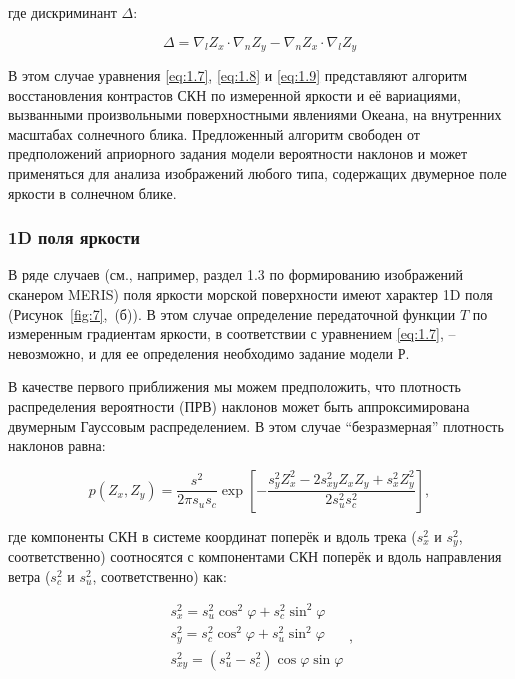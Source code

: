 \noindent где дискриминант $\Delta $:


\begin{equation} \label{eq:1.10)} 
\Delta =\nabla _{l} Z_{x} \cdot \nabla _{n} Z_{y}^{} -\nabla _{n} Z_{x} \cdot \nabla _{l} Z_{y}^{}  
\end{equation} 


В этом случае уравнения \eqref{eq:1.7}, \eqref{eq:1.8} и \eqref{eq:1.9} представляют алгоритм восстановления контрастов СКН по измеренной яркости и её вариациями, вызванными произвольными поверхностными явлениями Океана, на внутренних масштабах солнечного блика. Предложенный алгоритм свободен от предположений априорного задания модели вероятности наклонов и может применяться для анализа изображений любого типа, содержащих двумерное поле яркости в солнечном блике.



\subsubsection{1D поля яркости}

В ряде случаев (см., например, раздел 1.3 по формированию изображений сканером MERIS) поля яркости морской поверхности имеют характер 1D поля (Рисунок~\ref{fig:7},~(б)). В этом случае определение передаточной функции $T$ по измеренным градиентам яркости, в соответствии с уравнением \eqref{eq:1.7}, -- невозможно, и для ее определения необходимо задание модели Р.

В качестве первого приближения мы можем предположить, что плотность распределения вероятности (ПРВ) наклонов может быть аппроксимирована двумерным Гауссовым распределением. В этом случае ``безразмерная'' плотность наклонов равна:


\begin{equation} \label{eq:1.11} 
p(Z_{x} ,Z_{y} )=\frac{s^{2} }{2\pi s{}_{u} s{}_{c} } \exp \left[-\frac{s_{y}^{2} Z_{x}^{2} -2s_{xy}^{2} Z_{x}^{} Z_{y}^{} +s_{x}^{2} Z_{y}^{2} }{2s_{u}^{2} s_{c}^{2} } \right],  
\end{equation} 


\noindent где компоненты СКН в системе координат поперёк и вдоль трека ($s_{x}^{2} $ и $s_{y}^{2} $, соответственно) соотносятся с компонентами СКН поперёк и вдоль направления ветра ($s_{c}^{2} $ и $s_{u}^{2} $, соответственно) как:


\begin{equation} \label{eq:1.12} 
\begin{array}{l} {s_{x}^{2} =s_{u}^{2} \cos ^{2} \varphi +s_{c}^{2} \sin ^{2} \varphi } \\ {s_{y}^{2} =s_{c}^{2} \cos ^{2} \varphi +s_{u}^{2} \sin ^{2} \varphi } \\ {s_{xy}^{2} =(s_{u}^{2} -s_{c}^{2} )\cos \varphi \sin \varphi } \end{array},  
\end{equation} 


